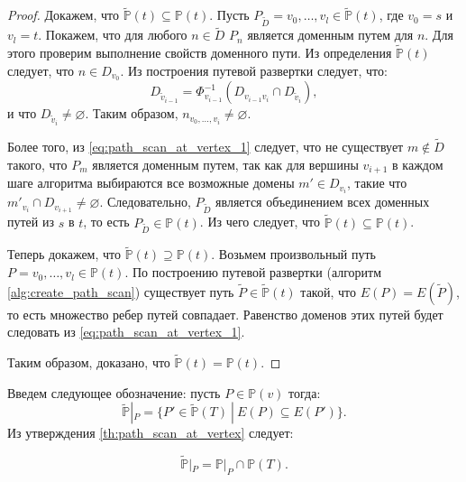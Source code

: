 \documentclass[../thesis.tex]{subfiles}
\begin{document}
\begin{proof}
Докажем, что $\widetilde{\mathbb{P}}(t)\subseteq \mathbb{P}(t)$.
Пусть $P_{\widetilde{D}}=v_0,\dots,v_l\in \widetilde{\mathbb{P}}(t)$, где $v_0=s$ и $v_l=t$.
Покажем, что для любого $n\in \widetilde{D}$ $P_n$ является доменным путем для $n$.
Для этого проверим выполнение свойств доменного пути.
Из определения $\widetilde{\mathbb{P}}(t)$ следует, что $n\in D_{v_0}$. Из построения путевой развертки следует, что:
\begin{equation} \label{eq:path_scan_at_vertex_1}
    D_{\tilde{v}_{i-1}} = \Phi^{-1}_{v_{i-1}}(D_{v_{i-1}v_i}\cap D_{\tilde{v}_i}),
\end{equation}
и что $D_{\tilde{v}_i}\neq \varnothing$.
Таким образом, $n_{v_0,\dots,v_i}\neq \varnothing$.

Более того, из \eqref{eq:path_scan_at_vertex_1} следует, что не существует $m\notin \widetilde{D}$ такого, что $P_m$ является доменным путем, так как для вершины $v_{i+1}$ в каждом шаге алгоритма выбираются все возможные домены $m'\in D_{v_i}$, такие что $m'_{v_i}\cap D_{v_{i+1}}\neq \varnothing$.
Следовательно, $P_{\widetilde{D}}$ является объединением всех доменных путей из $s$ в $t$, то есть $P_{\widetilde{D}}\in \mathbb{P}(t)$.
Из чего следует, что $\widetilde{\mathbb{P}}(t)\subseteq \mathbb{P}(t)$.

Теперь докажем, что $\widetilde{\mathbb{P}}(t)\supseteq \mathbb{P}(t)$.
Возьмем произвольный путь $P=v_0,\dots,v_l\in \mathbb{P}(t)$.
По построению путевой развертки (алгоритм \ref{alg:create_path_scan}) существует путь  $\widetilde{P}\in \widetilde{\mathbb{P}}(t)$ такой, что $E(P)=E(\widetilde{P})$, то есть множество ребер путей совпадает.
Равенство доменов этих путей будет следовать из \eqref{eq:path_scan_at_vertex_1}.

Таким образом, доказано, что $\widetilde{\mathbb{P}}(t) = \mathbb{P}(t)$.
\end{proof}

Введем следующее обозначение: пусть $P\in \mathbb{P}(v)$ тогда:
\begin{equation}
    \widetilde{\mathbb{P}}|_P = \big\{ P'\in \widetilde{\mathbb{P}}(T)\ |\ E(P)\subseteq E(P') \big\}.
\end{equation}
Из утверждения \ref{th:path_scan_at_vertex} следует:

\begin{corollary} \label{th:path_scan_projection}
\begin{equation}
    \widetilde{\mathbb{P}}|_P = \mathbb{P}|_P\cap \mathbb{P}(T).
\end{equation}
\end{corollary}
\ \\
\ \\
\end{document}
